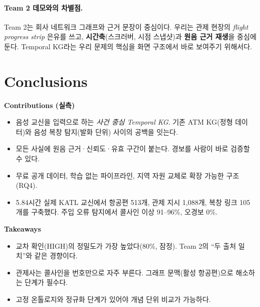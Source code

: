 \documentclass[10pt,a4paper]{article}
\begin{document}
\paragraph{Team 2 데모와의 차별점.} Team 2는 회사 네트워크 그래프와 근거 문장이 중심이다. 우리는 관제 현장의 \emph{flight progress strip} 은유를 쓰고, \textbf{시간축}(스크러버, 시점 스냅샷)과 \textbf{원음 근거 재생}을 중심에 둔다. Temporal KG라는 우리 문제의 핵심을 화면 구조에서 바로 보여주기 위해서다.

\section{Conclusions}
\begin{minipage}[t]{0.49\textwidth}
\textbf{Contributions (실측)}
\begin{itemize}[leftmargin=12pt]
\item 음성 교신을 입력으로 하는 \emph{사건 중심 Temporal KG}. 기존 ATM KG(정형 데이터)와 음성 복창 탐지(발화 단위) 사이의 공백을 잇는다.
\item 모든 사실에 원음 근거·신뢰도·유효 구간이 붙는다. 경보를 사람이 바로 검증할 수 있다.
\item 무료 공개 데이터, 학습 없는 파이프라인, 지역 자원 교체로 확장 가능한 구조(RQ4).
\item 5.84시간 실제 KATL 교신에서 항공편 513개, 관제 지시 1,088개, 복창 링크 105개를 구축했다. 주입 오류 탐지에서 콜사인 이상 91--96\%, 오경보 0\%.
\end{itemize}
\textbf{Takeaways}
\begin{itemize}[leftmargin=12pt]
\item 교차 확인(HIGH)의 정밀도가 가장 높았다(80\%, 잠정). Team 2의 ``두 출처 일치''와 같은 경향이다.
\item 관제사는 콜사인을 번호만으로 자주 부른다. 그래프 문맥(활성 항공편)으로 해소하는 단계가 필수다.
\item 고정 온톨로지와 정규화 단계가 있어야 개념 단위 비교가 가능하다.
\end{itemize}
\end{minipage}\hfill
\end{document}
